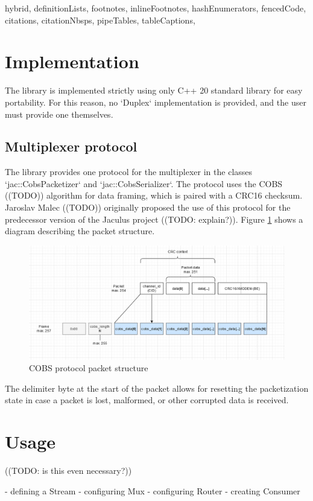 \documentclass[
  digital,
  oneside,
  nosansbold,
  nocolorbold,
  lof,
  lot
]{fithesis4}
\begin{document}
\begin{markdown*}{%
  hybrid,
  definitionLists,
  footnotes,
  inlineFootnotes,
  hashEnumerators,
  fencedCode,
  citations,
  citationNbsps,
  pipeTables,
  tableCaptions,
}
\section{Implementation}

The library is implemented strictly using only C++ 20 standard library for easy portability. For this reason, no `Duplex` implementation is provided, and the user must provide one themselves.

\subsection{Multiplexer protocol}

The library provides one protocol for the multiplexer in the classes `jac::CobsPacketizer` and `jac::CobsSerializer`. The protocol uses the COBS ((TODO)) algorithm for data framing, which is paired with a CRC16 checksum.  Jaroslav Malec ((TODO)) originally proposed the use of this protocol for the predecessor version of the Jaculus project ((TODO: explain?)). Figure \ref{fig:cobs-diagram} shows a diagram describing the packet structure.

\begin{figure}[ht]
    \centering
    \includegraphics[width=\textwidth]{cobs-diagram}
    \caption{COBS protocol packet structure}
    \label{fig:cobs-diagram}
\end{figure}

The delimiter byte at the start of the packet allows for resetting the packetization state in case a packet is lost, malformed, or other corrupted data is received.


\section{Usage}

((TODO: is this even necessary?))

  - defining a Stream
  - configuring Mux
  - configuring Router
  - creating Consumer



\end{markdown*}
\end{document}
